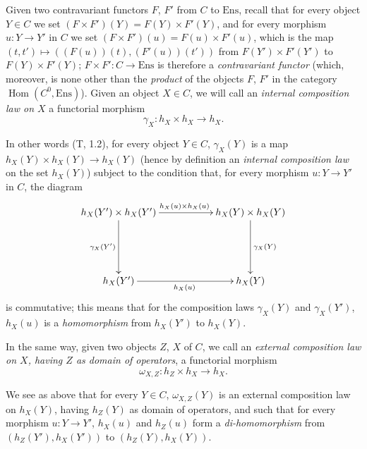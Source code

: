 \begin{env}[8.2.1]
\label{0.8.2.1}
Given two contravariant functors $F$, $F'$ from $C$ to
$\mathrm{Ens}$, recall that for every object $Y\in C$ we set
$(F\times F')(Y)=F(Y)\times F'(Y)$, and for every morphism $u:Y\to Y'$ in
$C$ we set $(F\times F')(u)=F(u)\times F'(u)$, which is the map
$(t,t')\mapsto((F(u))(t),(F'(u))(t'))$ from $F(Y')\times F'(Y')$ to
$F(Y)\times F'(Y)$; $F\times F':C\to\mathrm{Ens}$ is therefore a
\emph{contravariant functor} (which, moreover, is none other than the
\emph{product} of the objects $F$, $F'$ in the category
$\operatorname{Hom}(C^0,\mathrm{Ens})$). Given an object $X\in C$, we
will call an \emph{internal composition law on $X$} a functorial morphism
\[
  \gamma_X:h_X\times h_X\to h_X.
  \tag{8.2.1.1}\label{0.8.2.1.1}
\]

In other words (T, 1.2), for every object $Y\in C$, $\gamma_X(Y)$ is a
map $h_X(Y)\times h_X(Y)\to h_X(Y)$ (hence by definition an
\emph{internal composition law} on the set $h_X(Y)$) subject to the
condition that, for every morphism $u:Y\to Y'$ in $C$, the diagram
\[
  \xymatrix{
    h_X(Y')\times h_X(Y')
      \ar[rr]^{h_X(u)\times h_X(u)}\ar[dd]_{\gamma_X(Y')} &&
    h_X(Y)\times h_X(Y)\ar[dd]^{\gamma_X(Y)}\\\\
    h_X(Y')\ar[rr]_{h_X(u)} && h_X(Y)
  }
\]
is commutative; this means that for the composition laws
$\gamma_X(Y)$ and $\gamma_X(Y')$, $h_X(u)$ is a \emph{homomorphism} from
$h_X(Y')$ to $h_X(Y)$.

In the same way, given two objects $Z$, $X$ of $C$, we call an
\emph{external composition law on $X$, having $Z$ as domain of
operators}, a functorial morphism
\[
  \omega_{X,Z}:h_Z\times h_X\to h_X.
  \tag{8.2.1.2}\label{0.8.2.1.2}
\]

We see as above that for every $Y\in C$, $\omega_{X,Z}(Y)$ is an external
composition law on $h_X(Y)$, having $h_Z(Y)$ as domain of
operators, and such that for every morphism $u:Y\to Y'$, $h_X(u)$ and
$h_Z(u)$ form a \emph{di-homomorphism} from
$(h_Z(Y'),h_X(Y'))$ to $(h_Z(Y),h_X(Y))$.
\end{env}

